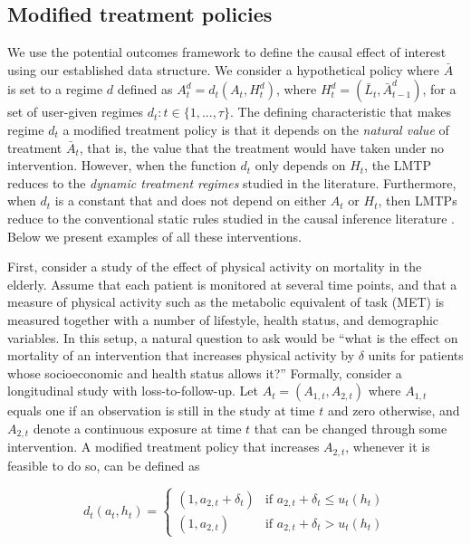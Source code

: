 \documentclass[]{jss}
\begin{document}
\hypertarget{modified-treatment-policies}{%
\subsection{Modified treatment
policies}\label{modified-treatment-policies}}

We use the potential outcomes framework to define the causal effect of
interest using our established data structure. We consider a
hypothetical policy where \(\bar{A}\) is set to a regime \(d\) defined
as \(A^{d}_t = d_t(A_t, H^{d}_t)\), where
\(H^{d}_t = (\bar{L}_t, \bar{A}^{d}_{t - 1})\), for a set of
user-given regimes \(d_t:t \in \{1, ..., \tau\}\). The defining
characteristic that makes regime \(d_t\) a modified treatment policy
is that it depends on the \emph{natural value} of treatment
\(\bar{A}_t\), that is, the value that the treatment would have taken
under no intervention. However, when the function $d_t$ only depends
on $H_t$, the LMTP reduces to the \textit{dynamic treatment regimes}
studied in the literature. Furthermore, when $d_t$ is a constant that
and does not depend on either $A_t$ or $H_t$, then LMTPs reduce to the
conventional static rules studied in the causal inference literature
\citep[e.g.,][]{bang2005doubly, van2011targeted}. Below we present
examples of all these interventions.

First, consider a study of the effect of physical activity on
mortality in the elderly. Assume that each patient is monitored at
several time points, and that a measure of physical activity such as
the metabolic equivalent of task (MET) \citep{mendes2018metabolic} is
measured together with a number of lifestyle, health status, and
demographic variables. In this setup, a natural question to ask would
be ``what is the effect on mortality of an intervention that increases
physical activity by $\delta$ units for patients whose socioeconomic
and health status allows it?'' Formally, consider a longitudinal study
with loss-to-follow-up. Let \(A_t = (A_{1, t}, A_{2, t})\) where
\(A_{1, t}\) equals one if an observation is still in the study at
time \(t\) and zero otherwise, and \(A_{2, t}\) denote a continuous
exposure at time \(t\) that can be changed through some
intervention. A modified treatment policy that increases \(A_{2,t}\),
whenever it is feasible to do so, can be defined as

\begin{equation}\label{eq:mtp}
d_t(a_t,h_t)=
\begin{cases}
  (1, a_{2,t} + \delta_t) & \text{if } a_{2,t} + \delta_t \leq u_t(h_t)  \\
  (1, a_{2,t}) & \text{if } a_{2,t} + \delta_t > u_t(h_t)
\end{cases}
\end{equation}
\end{document}
